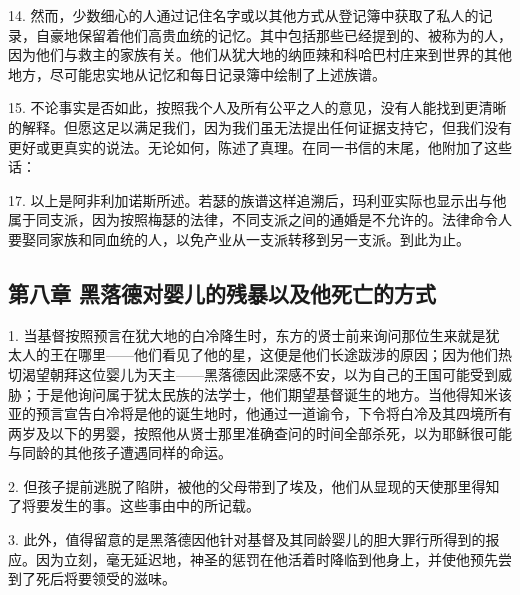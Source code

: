 14. 然而，少数细心的人通过记住名字或以其他方式从登记簿中获取了私人的记录，自豪地保留着他们高贵血统的记忆。其中包括那些已经提到的、被称为的人，因为他们与救主的家族有关。他们从犹大地的纳匝辣和科哈巴村庄来到世界的其他地方，尽可能忠实地从记忆和每日记录簿中绘制了上述族谱。\par

15. 不论事实是否如此，按照我个人及所有公平之人的意见，没有人能找到更清晰的解释。但愿这足以满足我们，因为我们虽无法提出任何证据支持它，但我们没有更好或更真实的说法。无论如何，陈述了真理。在同一书信的末尾，他附加了这些话：\par

17. 以上是阿非利加诺斯所述。若瑟的族谱这样追溯后，玛利亚实际也显示出与他属于同支派，因为按照梅瑟的法律，不同支派之间的通婚是不允许的。法律命令人要娶同家族和同血统的人，以免产业从一支派转移到另一支派。到此为止。\par


\subsection{第八章 黑落德对婴儿的残暴以及他死亡的方式}

1. 当基督按照预言在犹大地的白冷降生时，东方的贤士前来询问那位生来就是犹太人的王在哪里——他们看见了他的星，这便是他们长途跋涉的原因；因为他们热切渴望朝拜这位婴儿为天主——黑落德因此深感不安，以为自己的王国可能受到威胁；于是他询问属于犹太民族的法学士，他们期望基督诞生的地方。当他得知米该亚的预言宣告白冷将是他的诞生地时，他通过一道谕令，下令将白冷及其四境所有两岁及以下的男婴，按照他从贤士那里准确查问的时间全部杀死，以为耶稣很可能与同龄的其他孩子遭遇同样的命运。\par

2. 但孩子提前逃脱了陷阱，被他的父母带到了埃及，他们从显现的天使那里得知了将要发生的事。这些事由中的所记载。\par

3. 此外，值得留意的是黑落德因他针对基督及其同龄婴儿的胆大罪行所得到的报应。因为立刻，毫无延迟地，神圣的惩罚在他活着时降临到他身上，并使他预先尝到了死后将要领受的滋味。\par

